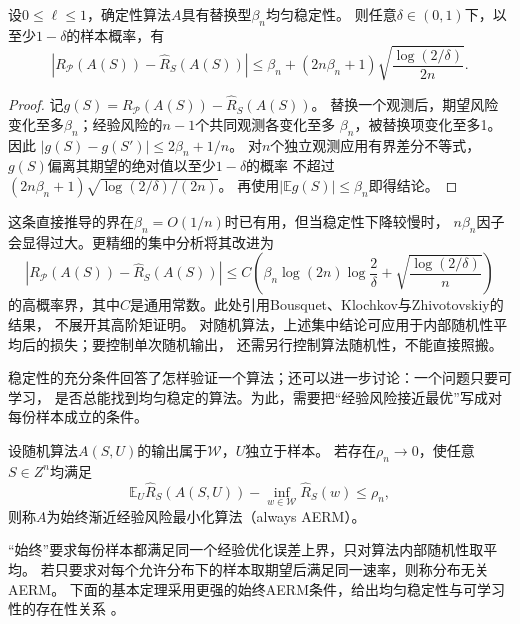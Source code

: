 \begin{theorem}[均匀稳定性的高概率泛化界]
\label{thm:stability-high-probability}
设$0\leq\ell\leq1$，确定性算法$A$具有替换型$\beta_n$均匀稳定性。
则任意$\delta\in(0,1)$下，以至少$1-\delta$的样本概率，有
\[
 |R_{\mathcal P}(A(S))-\hat R_S(A(S))|
 \leq\beta_n+(2n\beta_n+1)\sqrt{\frac{\log(2/\delta)}{2n}}.
\]
\end{theorem}
\begin{proof}
记$g(S)=R_{\mathcal P}(A(S))-\hat R_S(A(S))$。
替换一个观测后，期望风险变化至多$\beta_n$；经验风险的$n-1$个共同观测各变化至多
$\beta_n$，被替换项变化至多1。因此
$|g(S)-g(S')|\leq2\beta_n+1/n$。
对$n$个独立观测应用有界差分不等式，$g(S)$偏离其期望的绝对值以至少$1-\delta$的概率
不超过$(2n\beta_n+1)\sqrt{\log(2/\delta)/(2n)}$。
再使用$|\mathbb E g(S)|\leq\beta_n$即得结论。
\end{proof}

这条直接推导的界在$\beta_n=O(1/n)$时已有用，但当稳定性下降较慢时，
$n\beta_n$因子会显得过大。更精细的集中分析将其改进为
\[
 |R_{\mathcal P}(A(S))-\hat R_S(A(S))|
 \leq C\!\left(\beta_n\log(2n)\log\frac2\delta
          +\sqrt{\frac{\log(2/\delta)}n}\right)
\]
的高概率界，其中$C$是通用常数。此处引用Bousquet、Klochkov与Zhivotovskiy的结果，
不展开其高阶矩证明。
对随机算法，上述集中结论可应用于内部随机性平均后的损失；要控制单次随机输出，
还需另行控制算法随机性，不能直接照搬。

稳定性的充分条件回答了怎样验证一个算法；还可以进一步讨论：一个问题只要可学习，
是否总能找到均匀稳定的算法。为此，需要把“经验风险接近最优”写成对每份样本成立的条件。

\begin{definition}[始终渐近经验风险最小化]
\label{def:aerm}
设随机算法$A(S,U)$的输出属于$\mathcal W$，$U$独立于样本。
若存在$\rho_n\to0$，使任意$S\in Z^n$均满足
\[
 \mathbb E_U\hat R_S(A(S,U))-\inf_{w\in\mathcal W}\hat R_S(w)\leq\rho_n,
\]
则称$A$为始终渐近经验风险最小化算法（always AERM）。
\end{definition}

“始终”要求每份样本都满足同一个经验优化误差上界，只对算法内部随机性取平均。
若只要求对每个允许分布下的样本取期望后满足同一速率，则称分布无关AERM。
下面的基本定理采用更强的始终AERM条件，给出均匀稳定性与可学习性的存在性关系
。

